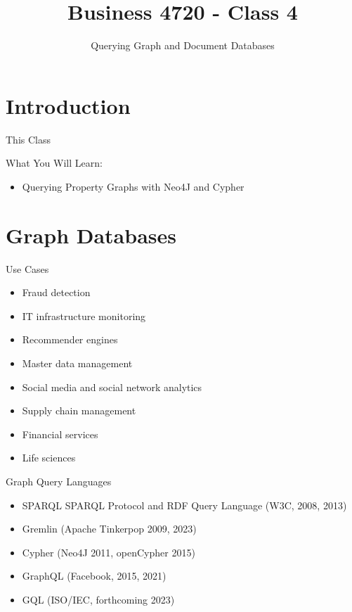 \documentclass[ignorenonframetext,xcolor=x11names]{beamer}
\title{Business 4720 - Class 4}
\subtitle{Querying Graph and Document Databases}
\begin{document}
\begin{frame}[label=full]{}
  \titlepage
  \footnotesize
  
\end{frame}

\section{Introduction}

\begin{frame}[label=full]{This Class}

\begin{block}{What You Will Learn:}
\begin{itemize}
  \item Querying Property Graphs with Neo4J and Cypher
\end{itemize}
\end{block}
\end{frame}

\section{Graph Databases}

\begin{frame}[label=full]{Use Cases}
\begin{itemize}
  \item Fraud detection
  \item IT infrastructure monitoring
  \item Recommender engines
  \item Master data management
  \item Social media and social network analytics
  \item Supply chain management
  \item Financial services
  \item Life sciences
\end{itemize}

\end{frame}


\begin{frame}[label=full]{Graph Query Languages}

\begin{itemize}
  \item SPARQL SPARQL Protocol and RDF Query Language (W3C, 2008, 2013)
  \item Gremlin (Apache Tinkerpop 2009, 2023)
  \item Cypher (Neo4J 2011, openCypher 2015)
  \item GraphQL (Facebook, 2015, 2021)
  \item GQL (ISO/IEC, forthcoming 2023)
\end{itemize}

\end{frame}
\end{document}
